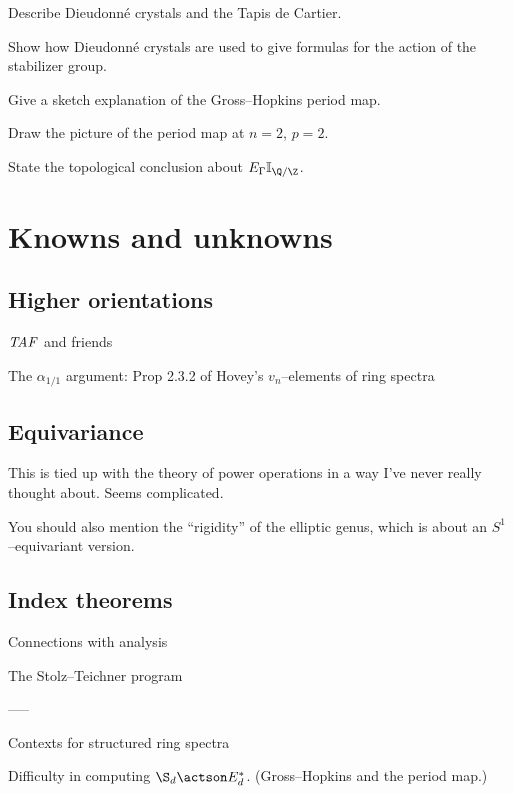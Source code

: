 Describe Dieudonn\'e crystals and the Tapis de Cartier.

Show how Dieudonn\'e crystals are used to give formulas for the action of the stabilizer group.

Give a sketch explanation of the Gross--Hopkins period map.

Draw the picture of the period map at $n = 2$, $p = 2$.

State the topological conclusion about $E_\Gamma \mathbb I_{\Q/\Z}$.





\section{Knowns and unknowns}



\subsection*{Higher orientations}

$\mathit{TAF}$ and friends\label{TAFDiscussion}

The $\alpha_{1/1}$ argument: Prop 2.3.2 of Hovey's $v_n$--elements of ring spectra


\subsection*{Equivariance}

This is tied up with the theory of power operations in a way I've never really thought about.  Seems complicated.

You should also mention the ``rigidity'' of the elliptic genus, which is about an $S^1$--equivariant version.

\subsection*{Index theorems}

Connections with analysis

The Stolz--Teichner program








-----

Contexts for structured ring spectra

Difficulty in computing $\S_d \actson E_d^*$. (Gross--Hopkins and the period map.)

